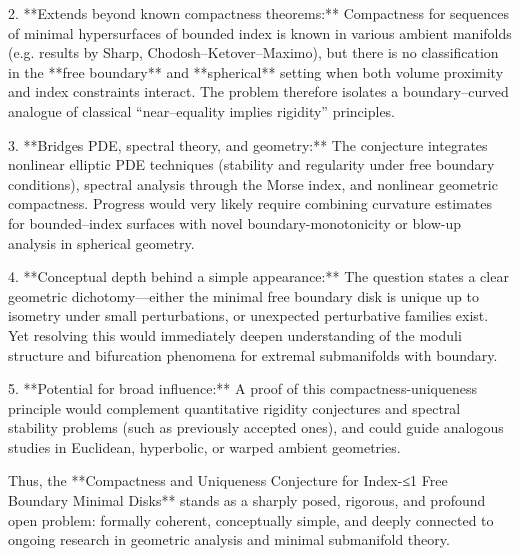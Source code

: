 2. **Extends beyond known compactness theorems:**  
   Compactness for sequences of minimal hypersurfaces of bounded index is known in various ambient manifolds (e.g. results by Sharp, Chodosh–Ketover–Maximo), but there is no classification in the **free boundary** and **spherical** setting when both volume proximity and index constraints interact. The problem therefore isolates a boundary–curved analogue of classical “near–equality implies rigidity” principles.

3. **Bridges PDE, spectral theory, and geometry:**  
   The conjecture integrates nonlinear elliptic PDE techniques (stability and regularity under free boundary conditions), spectral analysis through the Morse index, and nonlinear geometric compactness. Progress would very likely require combining curvature estimates for bounded–index surfaces with novel boundary-monotonicity or blow-up analysis in spherical geometry.

4. **Conceptual depth behind a simple appearance:**  
   The question states a clear geometric dichotomy—either the minimal free boundary disk is unique up to isometry under small perturbations, or unexpected perturbative families exist. Yet resolving this would immediately deepen understanding of the moduli structure and bifurcation phenomena for extremal submanifolds with boundary.

5. **Potential for broad influence:**  
   A proof of this compactness-uniqueness principle would complement quantitative rigidity conjectures and spectral stability problems (such as previously accepted ones), and could guide analogous studies in Euclidean, hyperbolic, or warped ambient geometries.

Thus, the **Compactness and Uniqueness Conjecture for Index-≤1 Free Boundary Minimal Disks** stands as a sharply posed, rigorous, and profound open problem: formally coherent, conceptually simple, and deeply connected to ongoing research in geometric analysis and minimal submanifold theory.